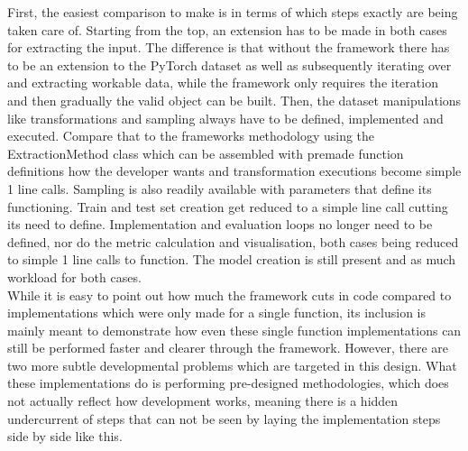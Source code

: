 First, the easiest comparison to make is in terms of which steps exactly are being taken care of. Starting from the top, an extension has to be made in both cases for extracting the input. The difference is that without the framework there has to be an extension to the PyTorch dataset as well as subsequently iterating over and extracting workable data, while the framework only requires the iteration and then gradually the valid object can be built. Then, the dataset manipulations like transformations and sampling always have to be defined, implemented and executed. Compare that to the frameworks methodology using the ExtractionMethod class which can be assembled with premade function definitions how the developer wants and transformation executions become simple 1 line calls. Sampling is also readily available with parameters that define its functioning. Train and test set creation get reduced to a simple line call cutting its need to define. Implementation and evaluation loops no longer need to be defined, nor do the metric calculation and visualisation, both cases being reduced to simple 1 line calls to function. The model creation is still present and as much workload for both cases.\\

While it is easy to point out how much the framework cuts in code compared to implementations which were only made for a single function, its inclusion is mainly meant to demonstrate how even these single function implementations can still be performed faster and clearer through the framework. However, there are two more subtle developmental problems which are targeted in this design. What these implementations do is performing pre-designed methodologies, which does not actually reflect how development works, meaning there is a hidden undercurrent of steps that can not be seen by laying the implementation steps side by side like this.\\ 

